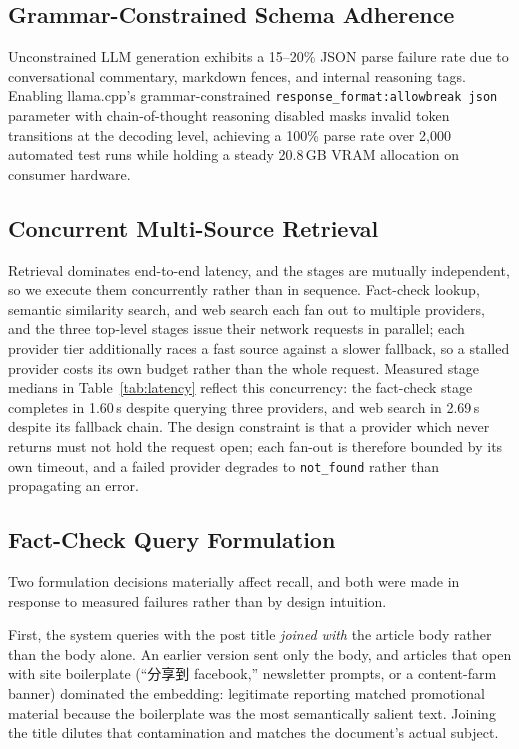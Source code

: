 \documentclass[twoside]{llncs}
\begin{document}
\subsection{Grammar-Constrained Schema Adherence}
Unconstrained LLM generation exhibits a 15--20\% JSON parse failure rate due to conversational commentary, markdown fences, and internal reasoning tags. Enabling llama.cpp's grammar-constrained \texttt{response\_format:allowbreak json} parameter with chain-of-thought reasoning disabled masks invalid token transitions at the decoding level, achieving a 100\% parse rate over 2,000 automated test runs while holding a steady 20.8\,GB VRAM allocation on consumer hardware.

\subsection{Concurrent Multi-Source Retrieval}
\label{sec:concurrent}
Retrieval dominates end-to-end latency, and the stages are mutually independent, so we execute them concurrently rather than in sequence. Fact-check lookup, semantic similarity search, and web search each fan out to multiple providers, and the three top-level stages issue their network requests in parallel; each provider tier additionally races a fast source against a slower fallback, so a stalled provider costs its own budget rather than the whole request. Measured stage medians in Table~\ref{tab:latency} reflect this concurrency: the fact-check stage completes in 1.60\,s despite querying three providers, and web search in 2.69\,s despite its fallback chain. The design constraint is that a provider which never returns must not hold the request open; each fan-out is therefore bounded by its own timeout, and a failed provider degrades to \texttt{not\_found} rather than propagating an error.

\subsection{Fact-Check Query Formulation}
\label{sec:query}
Two formulation decisions materially affect recall, and both were made in response to measured failures rather than by design intuition.

First, the system queries with the post title \emph{joined with} the article body rather than the body alone. An earlier version sent only the body, and articles that open with site boilerplate (``分享到 facebook,'' newsletter prompts, or a content-farm banner) dominated the embedding: legitimate reporting matched promotional material because the boilerplate was the most semantically salient text. Joining the title dilutes that contamination and matches the document's actual subject.
\end{document}
